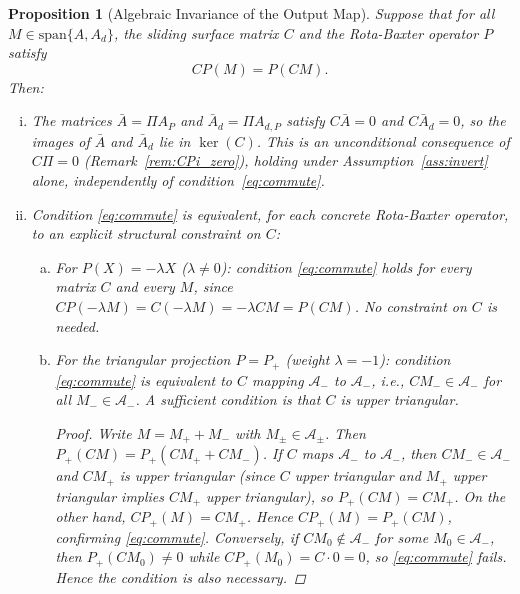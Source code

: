 \documentclass[10pt]{amsart}
\newcommand{\Ac}{\mathcal{A}}
\numberwithin{equation}{section}
\newtheorem{proposition}[theorem]{Proposition}
\begin{document}
\begin{proposition}[Algebraic Invariance of the Output Map]\label{prop:commute}
Suppose that for all $M \in \mathrm{span}\{A, A_d\}$, the sliding surface matrix $C$
and the Rota-Baxter operator $P$ satisfy
\begin{equation}\label{eq:commute}
C P(M) = P(C M).
\end{equation}
Then:
\begin{enumerate}[(i)]
  \item The matrices $\bar{A} = \Pi A_P$ and $\bar{A}_d = \Pi A_{d,P}$ satisfy
        $C\bar{A} = 0$ and $C\bar{A}_d = 0$, so the images of $\bar{A}$ and $\bar{A}_d$
        lie in $\ker(C)$. This is an unconditional consequence of $C\Pi = 0$
        (Remark~\ref{rem:CPi_zero}), holding under Assumption~\ref{ass:invert} alone,
        independently of condition~\eqref{eq:commute}.
  \item Condition \eqref{eq:commute} is equivalent, for each concrete Rota-Baxter
        operator, to an explicit structural constraint on $C$:
        \begin{enumerate}[(a)]
          \item For $P(X) = -\lambda X$ ($\lambda \neq 0$): condition \eqref{eq:commute}
                holds for \emph{every} matrix $C$ and every $M$, since
                $CP(-\lambda M) = C(-\lambda M) = -\lambda CM = P(CM)$. No constraint on $C$
                is needed.
          \item For the triangular projection $P = P_+$ (weight $\lambda=-1$):
                condition \eqref{eq:commute} is equivalent to $C$ mapping $\Ac_-$ to
                $\Ac_-$, i.e., $CM_- \in \Ac_-$ for all $M_- \in \Ac_-$. A sufficient
                condition is that $C$ is upper triangular.
                \begin{proof}
                  Write $M = M_+ + M_-$ with $M_\pm \in \Ac_\pm$. Then
                  $P_+(CM) = P_+(CM_+ + CM_-)$. If $C$ maps $\Ac_-$ to $\Ac_-$, then
                  $CM_- \in \Ac_-$ and $CM_+$ is upper triangular (since $C$ upper
                  triangular and $M_+$ upper triangular implies $CM_+$ upper triangular),
                  so $P_+(CM) = CM_+$. On the other hand,
                  $CP_+(M) = C M_+$. Hence $CP_+(M) = P_+(CM)$, confirming
                  \eqref{eq:commute}. Conversely, if $CM_0 \notin \Ac_-$ for some
                  $M_0 \in \Ac_-$, then $P_+(CM_0) \neq 0$ while $CP_+(M_0) = C\cdot 0 = 0$,
                  so \eqref{eq:commute} fails. Hence the condition is also necessary.
                \end{proof}
        \end{enumerate}
\end{enumerate}


\end{proposition}
\end{document}
